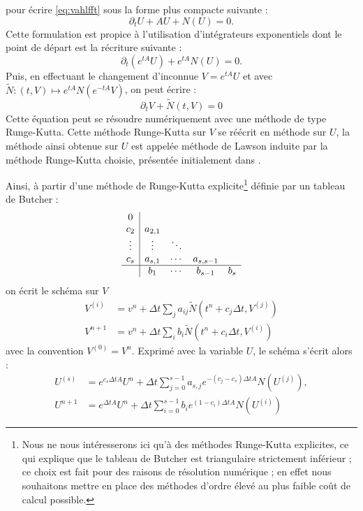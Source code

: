 pour écrire \eqref{eq:vahlfft} sous la forme plus compacte suivante :
$$
  \partial_t U + AU + N(U) = 0. 
$$
Cette formulation est propice à l'utilisation d'intégrateurs exponentiels dont le point de départ est la récriture suivante :
$$
  \partial_t(e^{tA}U) + e^{tA}N(U) = 0. 
$$
Puis, en effectuant le changement d'inconnue $V=e^{tA}U$ et avec $\tilde{N}:(t,V)\mapsto e^{tA}N(e^{-tA}V)$, on peut écrire :
$$
  \partial_t V + \tilde{N}(t,V) = 0
$$
Cette équation peut se résoudre numériquement avec une méthode de type Runge-Kutta. Cette méthode Runge-Kutta sur $V$ se réécrit en méthode sur $U$, la méthode ainsi obtenue sur $U$ est appelée méthode de Lawson induite par la méthode Runge-Kutta choisie, présentée initialement dans \cite{Lawson:1967a}.

Ainsi, à partir d'une méthode de Runge-Kutta explicite\footnote{Nous ne nous intéresserons ici qu'à des méthodes Runge-Kutta explicites, ce qui explique que le tableau de Butcher est triangulaire strictement inférieur ; ce choix est fait pour des raisons de résolution numérique ; en effet nous souhaitons mettre en place des méthodes d'ordre élevé au plus faible coût de calcul possible.} définie par un tableau de Butcher :
$$
  \begin{array}{c|cccc}
    0      &         &        &           & \\
    c_2    & a_{2,1} &        &           & \\
    \vdots & \vdots  & \ddots &           & \\
    c_s    & a_{s,1} & \cdots & a_{s,s-1} & \\
    \hline
           & b_1     & \cdots & b_{s-1}   & b_s
  \end{array}
$$
on écrit le schéma sur $V$ 
$$
  \begin{aligned}
    V^{(i)} &= v^n + \Delta t \sum_j a_{ij} \tilde{N}(t^n+c_j\Delta t , V^{(j)}) \\
    V^{n+1} &= v^n + \Delta t \sum_i b_i \tilde{N}(t^n+c_i\Delta t , V^{(i)})
  \end{aligned}
$$
avec la convention $V^{(0)} = V^n$.  Exprimé avec la variable $U$, le schéma s'écrit alors :
$$
  \begin{aligned}
    U^{(s)} &= e^{c_s \Delta t A}U^n + \Delta t\sum_{j=0}^{s-1} a_{s, j} e^{-(c_j-c_s)\Delta t A} N(U^{(j)}),  \\
    U^{n+1} &= e^{\Delta t A}U^n + \Delta t\sum_{i=0}^{s-1}    b_i e^{(1-c_i)\Delta t A} N(U^{(i)})
  \end{aligned}
$$

